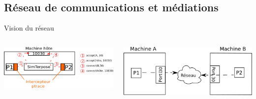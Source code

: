 \documentclass[10.5pt]{beamer}
\begin{document}
\subsection{Réseau de communications et médiations}
\begin{frame}{\subsecname}
\begin{alertblock}{Vision du réseau}
 \begin{columns}[c]
   \begin{column}{4cm}
     \includegraphics[scale=0.5]{Pictures/png/Mediation_realite}
   \end{column}
   \begin{column}{4cm}
      \includegraphics[scale=0.4]{Pictures/png/Mediation_VM}
   \end{column}
 \end{columns}
 
\end{alertblock}


\end{frame}
\end{document}
